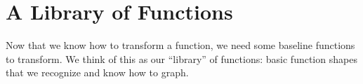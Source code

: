 \section{A Library of Functions}
Now that we know how to transform a function, we need some baseline functions to transform. We think of this as our ``library'' of functions: basic function shapes that we recognize and know how to graph.

%




%


